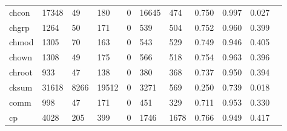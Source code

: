 \begin{longtable}{lp{1.10cm}p{1.10cm}p{1.10cm}p{1.10cm}p{1.10cm}p{1.10cm}p{1.10cm}p{1.10cm}p{1.10cm}p{1.10cm}}
chcon     &                  17348 &                                 49 &                               180 &                                0 &                             16645 &                             474 &                             0.750 &                                 0.997 &                               0.027 \\
chgrp     &                   1264 &                                 50 &                               171 &                                0 &                               539 &                             504 &                             0.752 &                                 0.960 &                               0.399 \\
chmod     &                   1305 &                                 70 &                               163 &                                0 &                               543 &                             529 &                             0.749 &                                 0.946 &                               0.405 \\
chown     &                   1308 &                                 49 &                               175 &                                0 &                               566 &                             518 &                             0.754 &                                 0.963 &                               0.396 \\
chroot    &                    933 &                                 47 &                               138 &                                0 &                               380 &                             368 &                             0.737 &                                 0.950 &                               0.394 \\
cksum     &                  31618 &                               8266 &                             19512 &                                0 &                              3271 &                             569 &                             0.250 &                                 0.739 &                               0.018 \\
comm      &                    998 &                                 47 &                               171 &                                0 &                               451 &                             329 &                             0.711 &                                 0.953 &                               0.330 \\
cp        &                   4028 &                                205 &                               399 &                                0 &                              1746 &                            1678 &                             0.766 &                                 0.949 &                               0.417 \\

\end{longtable}
